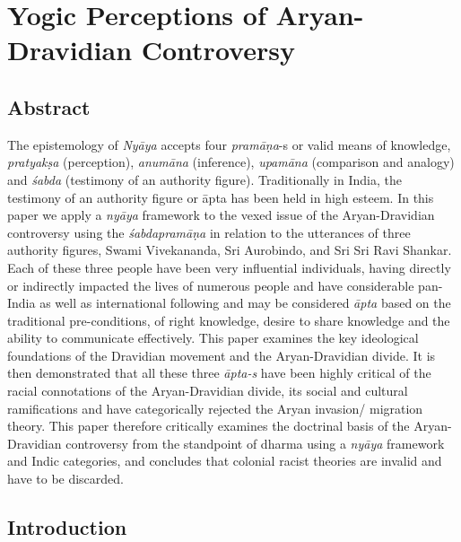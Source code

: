 
\chapter{Yogic Perceptions of Aryan-Dravidian Controversy}\label{intro}



\section*{Abstract}

The epistemology of \textit{Nyāya} accepts four \textit{pramāṇa}-s or valid means of knowledge, \textit{pratyakṣa} (perception), \textit{anumāna} (inference), \textit{upamāna} (comparison and analogy) and \textit{śabda} (testimony of an authority figure). Traditionally in India, the testimony of an authority figure or āpta has been held in high esteem. In this paper we apply a \textit{nyāya} framework to the vexed issue of the Aryan-Dravidian controversy using the \textit{śabdapramāṇa} in relation to the utterances of three authority figures, Swami Vivekananda, Sri Aurobindo, and Sri Sri Ravi Shankar. Each of these three people have been very influential individuals, having directly or indirectly impacted the lives of numerous people and have considerable pan-India as well as international following and may be considered\textit{ āpta} based on the traditional pre-conditions, of right knowledge, desire to share knowledge and the ability to communicate effectively. This paper examines the key ideological foundations of the Dravidian movement and the Aryan-Dravidian divide. It is then demonstrated that all these three \textit{āpta-s} have been highly critical of the racial connotations of the Aryan-Dravidian divide, its social and cultural ramifications and have categorically rejected the Aryan invasion/ migration theory. This paper therefore critically examines the doctrinal basis of the Aryan-Dravidian controversy from the standpoint of dharma using a \textit{nyāya} framework and Indic categories, and concludes that colonial racist theories are invalid and have to be discarded.


\section*{Introduction}

